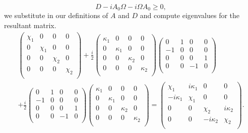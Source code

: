 \documentclass[11pt,a4paper]{article}
\numberwithin{equation}{section}
\begin{document}
	\begin{equation*}
		D - iA_0 \Omega - i\Omega A_0 \geq 0,
	\end{equation*}
	we substitute in our definitions of $A$ and $D$ and compute eigenvalues for the resultant matrix. 
	\begin{multline*}
	\begin{pmatrix}
	\chi_1 & 0 & 0 & 0\\
	0 & \chi_1 & 0 & 0\\
	0 & 0 & \chi_2 & 0 \\
	0 & 0 & 0 & \chi_2\\
	\end{pmatrix} + \frac{i}{2}\begin{pmatrix}
	\kappa_1 & 0 & 0 & 0\\
	0 & \kappa_1 & 0 & 0\\
	0 & 0 & \kappa_2 & 0 \\
	0 & 0 & 0 & \kappa_2\\
	\end{pmatrix}\begin{pmatrix}
	0 & 1 & 0 & 0 \\
	-1 & 0 & 0 & 0\\
	0 & 0 & 0 & 1\\
	0 & 0 & -1 & 0\\
	\end{pmatrix} \\
	+ \frac{i}{2}\begin{pmatrix}
	0 & 1 & 0 & 0 \\
	-1 & 0 & 0 & 0\\
	0 & 0 & 0 & 1\\
	0 & 0 & -1 & 0\\
	\end{pmatrix}\begin{pmatrix}
	\kappa_1 & 0 & 0 & 0\\
	0 & \kappa_1 & 0 & 0\\
	0 & 0 & \kappa_2 & 0 \\
	0 & 0 & 0 & \kappa_2\\
	\end{pmatrix}
	= \begin{pmatrix}
	\chi_1 & i\kappa_1 & 0 & 0 \\
	-i\kappa_1 & \chi_1 & 0 & 0\\
	0 & 0 & \chi_2 & i\kappa_2\\
	0 & 0 & -i\kappa_2 & \chi_2\\
	\end{pmatrix}.
	\end{multline*}
	
\end{document}
